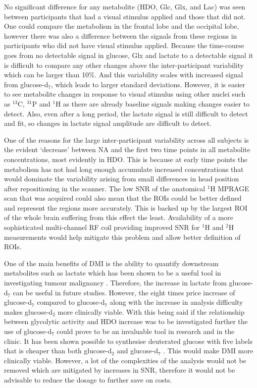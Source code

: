 No significant difference for any metabolite (\ac{HDO}, Glc, Glx, and Lac) was seen between participants that had a visual stimulus applied and those that did not. One could compare the metabolism in the frontal lobe and the occipital lobe, however there was also a difference between the signals from these regions in participants who did not have visual stimulus applied. Because the time-course goes from no detectable signal in glucose, Glx and lactate to a detectable signal it is difficult to compare any other changes above the inter-participant variability which can be larger than 10\%. And this variability scales with increased signal from glucose-d$_7$, which leads to larger standard deviations. However, it is easier to see metabolite changes in response to visual stimulus using other nuclei such as $^{13}$C, $^{31}$P and $^1$H as there are already baseline signals making changes easier to detect. Also, even after a long period, the lactate signal is still difficult to detect and fit, so changes in lactate signal amplitude are difficult to detect.  

One of the reasons for the large inter-participant variability across all subjects is the evident ‘decrease’ between \ac{NA} and the first two time points in all metabolite concentrations, most evidently in HDO. This is because at early time points the metabolism has not had long enough accumulate increased concentrations that would dominate the variability arising from small differences in head position after repositioning in the scanner. The low \ac{SNR} of the anatomical $^1$H \ac{MPRAGE} scan that was acquired could also mean that the \ac{ROI}s could be better defined and represent the regions more accurately. This is backed up by the largest ROI of the whole brain suffering from this effect the least. Availability of a more sophisticated multi-channel \ac{RF} coil providing improved \ac{SNR} for $^1$H and $^2$H measurements would help mitigate this problem and allow better definition of \ac{ROI}s.

One of the main benefits of \ac{DMI} is the ability to quantify downstream metabolites such as lactate which has been shown to be a useful tool in investigating tumour malignancy \cite{Howe2003MetabolicSpectroscopy}. Therefore, the increase in lactate from glucose-d$_7$ can be useful in future studies. However, the eight times price increase of glucose-d$_7$ compared to glucose-d$_7$ along with the increase in analysis difficulty makes glucose-d$_2$ more clinically viable. With this being said if the relationship between glycolytic activity and HDO increase was to be investigated further the use of glucose-d$_7$ could prove to be an invaluable tool in research and in the clinic. It has been shown possible to synthesise deuterated glucose with five labels that is cheaper than both glucose-d$_2$ and glucose-d$_7$ \cite{Zou2023AImaging}. This would make \ac{DMI} more clinically viable. However, a lot of the complexities of the analysis would not be removed which are mitigated by increases in \ac{SNR}, therefore it would not be advisable to reduce the dosage to further save on costs. 

